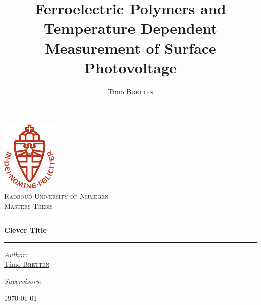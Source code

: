 \begin{titlepage}

\title{Ferroelectric Polymers and Temperature Dependent Measurement of Surface Photovoltage}
\author{\href{mailto:t.bretten@gmail.com}{Timo \textsc{Bretten}}}


\begin{center}
\includegraphics[width=0.2\textwidth]{../figs/logos/LogoRed}~\\[1cm]
\textsc{\LARGE Radboud University of Nijmegen}\\[1.5cm]
\textsc{\large Masters Thesis}\\[0.5cm]

\hrule
\bigskip
{\huge \bfseries Clever Title \bigskip}
\hrule
\bigskip
\noindent
\begin{minipage}[t]{0.4\textwidth}
\begin{flushleft} \large
\emph{Author:}\\
\href{mailto:t.bretten@gmail.com}{Timo \textsc{Bretten}}
\end{flushleft}
\end{minipage}%
\begin{minipage}[t]{0.4\textwidth}
\begin{flushright} \large
\emph{Supervisors:} \\
\end{flushright}
\end{minipage}

\vfill

{\large \today}

\end{center}

\end{titlepage}